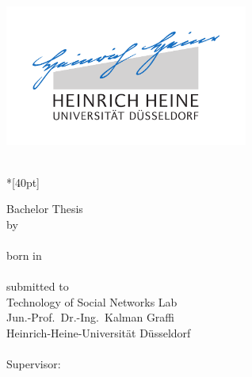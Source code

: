 
\begin{titlepage}
  \centering
  \includegraphics[width=8cm]{fig/unilogo}

  \vfill
  \Huge
  \thesistitle{}\\*[40pt]
  \normalsize

% 
    
   \vfill
  \Large
  Bachelor Thesis\\[0.25em]
  \large
  by\\[5mm]
  \huge
  \thesisauthor{}\\

  \vspace{5mm}
  \large
  born in\\ \thesisauthorbirthplace{}\\[1cm]
  submitted to\\[5mm]
  Technology of Social Networks Lab\\
  Jun.-Prof.\ Dr.-Ing.\ Kalman Graffi\\ 
  Heinrich-Heine-Universit{\"a}t D{\"u}sseldorf\\[0.5cm]
  \thesissubmissionmonth{} \thesissubmissionyear{}\\[0.5cm]
  Supervisor:\\
  \thesissupervisor{}  
    
    
    
\end{titlepage}


